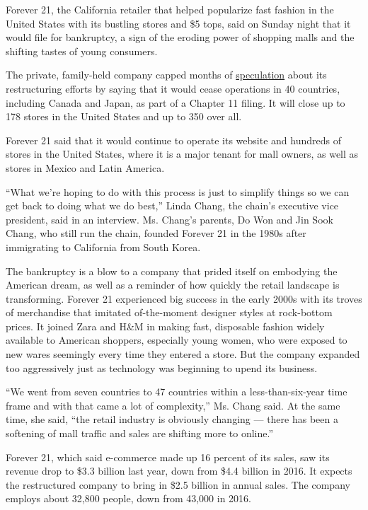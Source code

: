 Forever 21, the California retailer that helped popularize fast fashion
in the United States with its bustling stores and \$5 tops, said on
Sunday night that it would file for bankruptcy, a sign of the eroding
power of shopping malls and the shifting tastes of young consumers.

The private, family-held company capped months of
\href{https://www.nytimes3xbfgragh.onion/2019/09/12/business/forever-21-bankruptcy.html}{speculation}
about its restructuring efforts by saying that it would cease operations
in 40 countries, including Canada and Japan, as part of a Chapter 11
filing. It will close up to 178 stores in the United States and up to
350 over all.

Forever 21 said that it would continue to operate its website and
hundreds of stores in the United States, where it is a major tenant for
mall owners, as well as stores in Mexico and Latin America.

``What we're hoping to do with this process is just to simplify things
so we can get back to doing what we do best,'' Linda Chang, the chain's
executive vice president, said in an interview. Ms. Chang's parents, Do
Won and Jin Sook Chang, who still run the chain, founded Forever 21 in
the 1980s after immigrating to California from South Korea.

The bankruptcy is a blow to a company that prided itself on embodying
the American dream, as well as a reminder of how quickly the retail
landscape is transforming. Forever 21 experienced big success in the
early 2000s with its troves of merchandise that imitated of-the-moment
designer styles at rock-bottom prices. It joined Zara and H\&M in making
fast, disposable fashion widely available to American shoppers,
especially young women, who were exposed to new wares seemingly every
time they entered a store. But the company expanded too aggressively
just as technology was beginning to upend its business.

``We went from seven countries to 47 countries within a
less-than-six-year time frame and with that came a lot of complexity,''
Ms. Chang said. At the same time, she said, ``the retail industry is
obviously changing --- there has been a softening of mall traffic and
sales are shifting more to online.''

Forever 21, which said e-commerce made up 16 percent of its sales, saw
its revenue drop to \$3.3 billion last year, down from \$4.4 billion in
2016. It expects the restructured company to bring in \$2.5 billion in
annual sales. The company employs about 32,800 people, down from 43,000
in 2016.

